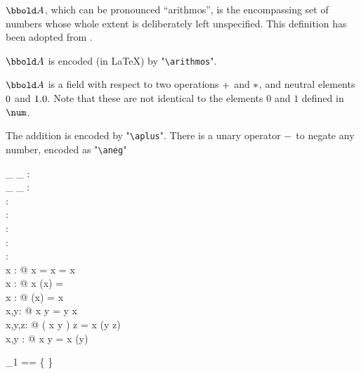 \documentclass[12pt]{article}
\begin{document}
$\arithmos$, which can be pronounced “arithmos”, is the encompassing
set of numbers whose whole extent is deliberately left
unspecified. This definition has been adopted from
\cite{Valentine2012}.

\begin{zed}
  [\arithmos] 
\end{zed}

$\arithmos$ is encoded (in \LaTeX) by "\texttt{\textbackslash arithmos}".

$\arithmos$ is a field with respect to two operations $+$ and
$*$, and neutral elements $0$ and $1.0$. Note that these
are not identical to the elements $0$ and $1$ defined in $\num$.

The addition is encoded by "\texttt{\textbackslash{}aplus}". There is
a unary operator $-$ to negate any number, encoded as
"\texttt{\textbackslash{}aneg}"
\begin{axdef}
  \_ \aplus \_ : \arithmos \cross \arithmos \fun \arithmos\\
  \_ \aminus \_ : \arithmos \cross \arithmos \fun \arithmos\\
  \aneg : \arithmos \fun \arithmos\\
  \azero : \arithmos\\
  \aone : \arithmos\\
  \atwo : \arithmos\\
  \aten : \arithmos\\
  \where
  \forall x : \arithmos @ x \aplus \azero = \azero \aplus x = x \\
  \forall x : \arithmos @ x \aplus (\aneg x) = \azero \\
  \forall x : \arithmos @ \aneg (\aneg x) = x \\
  \forall x,y: \arithmos @ x \aplus y = y \aplus x \\
  \forall x,y,z: \arithmos @ ( x \aplus y ) \aplus z = x \aplus (y
  \aplus z) \\
  \forall x,y : \arithmos @ x \aminus y = x \aplus (\aneg y)\\
\end{axdef}

\begin{zed}
  \arithmos_1 == \arithmos \setminus \{ \azero \}
\end{zed}
\end{document}
